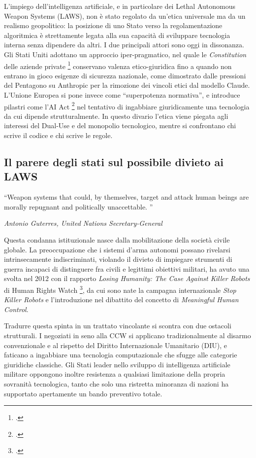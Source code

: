 \documentclass[a4paper,12pt]{report}
\begin{document}
L'impiego dell'intelligenza artificiale, e in particolare dei Lethal Autonomous
Weapon Systems (LAWS), non è stato regolato da un'etica universale ma da un
realismo geopolitico: la posizione di uno Stato verso la regolamentazione
algoritmica è strettamente legata alla sua capacità di sviluppare tecnologia
interna senza dipendere da altri. I due principali attori sono oggi in
dissonanza. Gli Stati Uniti adottano un approccio iper-pragmatico, nel quale le
\textit{Constitution} delle aziende private \footcite{anthropic_constitution}
conservano valenza etico-giuridica fino a quando non entrano in gioco esigenze
di sicurezza nazionale, come dimostrato dalle pressioni del Pentagono su
Anthropic per la rimozione dei vincoli etici dal modello Claude. L'Unione
Europea si pone invece come ``superpotenza normativa'', e introduce pilastri
come l'AI Act \footcite{wareham_2020} nel tentativo di ingabbiare giuridicamente
una tecnologia da cui dipende strutturalmente. In questo divario l'etica viene
piegata agli interessi del Dual-Use e del monopolio tecnologico, mentre si
confrontano chi scrive il codice e chi scrive le regole.
 
\subsection{Il parere degli stati sul possibile divieto ai LAWS}
\begin{flushright}
\begin{minipage}{0.6\textwidth}
\epigraph{
    ``Weapon systems that could, by themselves, target and attack human beings are morally repugnant and politically unaccettable. ''
}{\textit{Antonio Guterres, United Nations Secretary-General}}
\end{minipage}
\end{flushright}
 
Questa condanna istituzionale nasce dalla mobilitazione della società civile
globale. La preoccupazione che i sistemi d'arma autonomi possano rivelarsi
intrinsecamente indiscriminati, violando il divieto di impiegare strumenti di
guerra incapaci di distinguere fra civili e legittimi obiettivi militari, ha
avuto una svolta nel 2012 con il rapporto \textit{Losing Humanity: The Case
Against Killer Robots} di Human Rights Watch \footcite{wareham_2020}, da cui
sono nate la campagna internazionale \textit{Stop Killer Robots} e
l'introduzione nel dibattito del concetto di \textit{Meaningful Human Control}.
 
Tradurre questa spinta in un trattato vincolante si scontra con due ostacoli
strutturali. I negoziati in seno alla CCW si applicano tradizionalmente al
disarmo convenzionale e al rispetto del Diritto Internazionale Umanitario (DIU),
e faticano a ingabbiare una tecnologia computazionale che sfugge alle categorie
giuridiche classiche. Gli Stati leader nello sviluppo di intelligenza
artificiale militare oppongono inoltre resistenza a qualsiasi limitazione della
propria sovranità tecnologica, tanto che solo una ristretta minoranza di nazioni
ha supportato apertamente un bando preventivo totale.
 
\end{document}
